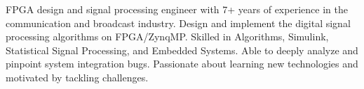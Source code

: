 \par{
    FPGA design and signal processing engineer with 7+ years of experience in the communication 
    and broadcast industry. Design and implement the digital signal processing algorithms on FPGA/ZynqMP.
    Skilled in Algorithms, Simulink, Statistical Signal Processing, and Embedded Systems.
    Able to deeply analyze and pinpoint system integration bugs. Passionate about learning 
    new technologies and motivated by tackling challenges.
    \\
}
